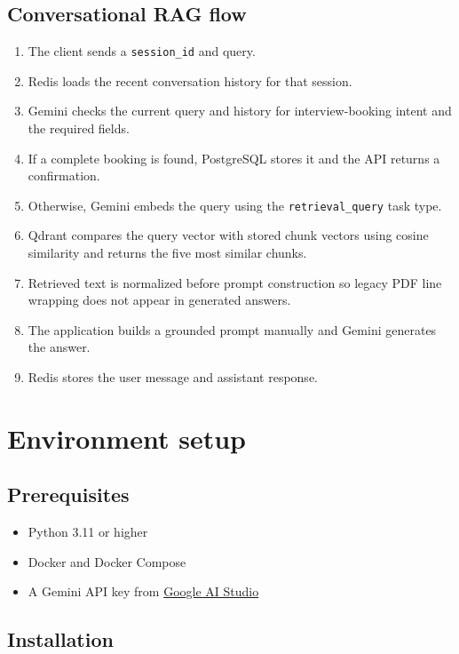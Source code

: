 \documentclass[12pt, a4paper]{article}
\begin{document}
\subsection{Conversational RAG flow}

\begin{enumerate}[leftmargin=1.5em]
    \item The client sends a \texttt{session\_id} and query.
    \item Redis loads the recent conversation history for that session.
    \item Gemini checks the current query and history for interview-booking
    intent and the required fields.
    \item If a complete booking is found, PostgreSQL stores it and the API
    returns a confirmation.
    \item Otherwise, Gemini embeds the query using the
    \texttt{retrieval\_query} task type.
    \item Qdrant compares the query vector with stored chunk vectors using
    cosine similarity and returns the five most similar chunks.
    \item Retrieved text is normalized before prompt construction so legacy
    PDF line wrapping does not appear in generated answers.
    \item The application builds a grounded prompt manually and Gemini
    generates the answer.
    \item Redis stores the user message and assistant response.
\end{enumerate}

\section{Environment setup}

\subsection{Prerequisites}

\begin{itemize}[leftmargin=1.5em]
    \item Python 3.11 or higher
    \item Docker and Docker Compose
    \item A Gemini API key from
    \href{https://aistudio.google.com/app/apikey}{Google AI Studio}
\end{itemize}

\subsection{Installation}
\end{document}
